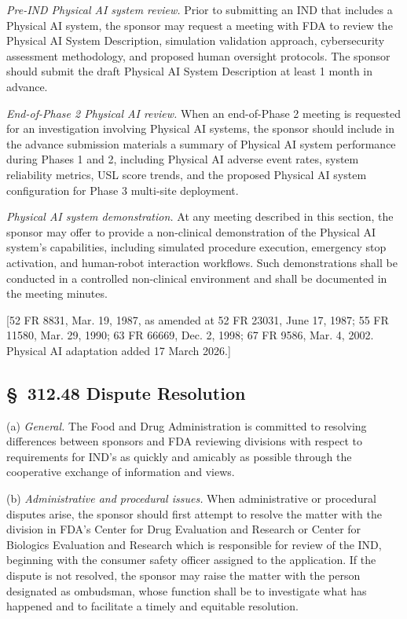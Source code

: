 \begin{description}[leftmargin=0.8cm,style=sameline]
\item[(i)] \textit{Pre-IND Physical AI system review.} Prior to submitting an IND that includes a Physical AI system, the sponsor may request a meeting with FDA to review the Physical AI System Description, simulation validation approach, cybersecurity assessment methodology, and proposed human oversight protocols. The sponsor should submit the draft Physical AI System Description at least 1 month in advance.
\item[(ii)] \textit{End-of-Phase 2 Physical AI review.} When an end-of-Phase 2 meeting is requested for an investigation involving Physical AI systems, the sponsor should include in the advance submission materials a summary of Physical AI system performance during Phases 1 and 2, including Physical AI adverse event rates, system reliability metrics, USL score trends, and the proposed Physical AI system configuration for Phase 3 multi-site deployment.
\item[(iii)] \textit{Physical AI system demonstration.} At any meeting described in this section, the sponsor may offer to provide a non-clinical demonstration of the Physical AI system's capabilities, including simulated procedure execution, emergency stop activation, and human-robot interaction workflows. Such demonstrations shall be conducted in a controlled non-clinical environment and shall be documented in the meeting minutes.
\end{description}

[52 FR 8831, Mar. 19, 1987, as amended at 52 FR 23031, June 17, 1987; 55 FR 11580, Mar. 29, 1990; 63 FR 66669, Dec. 2, 1998; 67 FR 9586, Mar. 4, 2002. Physical AI adaptation added 17 March 2026.]

\subsection{\S~312.48 Dispute Resolution}

(a) \textit{General.} The Food and Drug Administration is committed to resolving differences between sponsors and FDA reviewing divisions with respect to requirements for IND's as quickly and amicably as possible through the cooperative exchange of information and views.

(b) \textit{Administrative and procedural issues.} When administrative or procedural disputes arise, the sponsor should first attempt to resolve the matter with the division in FDA's Center for Drug Evaluation and Research or Center for Biologics Evaluation and Research which is responsible for review of the IND, beginning with the consumer safety officer assigned to the application. If the dispute is not resolved, the sponsor may raise the matter with the person designated as ombudsman, whose function shall be to investigate what has happened and to facilitate a timely and equitable resolution.

